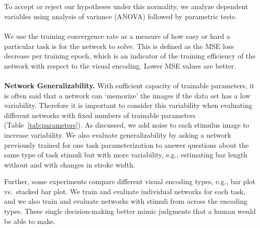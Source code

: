 \\~\\
 To accept or reject our hypotheses under this normality, we analyze dependent variables using analysis of variance (ANOVA) followed by parametric tests. %
\\~\\
 We use the training convergence rate as a measure of how easy or hard a particular task is for the network to solve. This is defined as the MSE loss decrease per training epoch, which is an indicator of the training efficiency of the network with respect to the visual encoding. Lower MSE values are better. %
\\~\\
\noindent\textbf{Network Generalizability.} With sufficient capacity of trainable parameters, it is often said that a network can `memorize' the images if the data set has a low variability. Therefore it is important to consider this variability when evaluating different networks with fixed numbers of trainable parameters (Table~\ref{tab:parameters}). As discussed, we add noise to each stimulus image to increase variability. We also evaluate generalizability by asking a network previously trained for one task parameterization to answer questions about the same type of task stimuli but with more variability, e.g., estimating bar length without and with changes in stroke width.

Further, some experiments compare different visual encoding types, e.g., bar plot vs.~stacked bar plot. We train and evaluate individual networks for each task, and we also train and evaluate networks with stimuli from across the encoding types. These single decision-making  better mimic judgments that a human would be able to make. 

